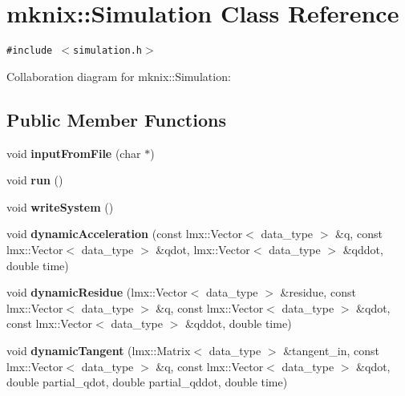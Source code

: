 \hypertarget{classmknix_1_1Simulation}{
\section{mknix::Simulation Class Reference}
\label{classmknix_1_1Simulation}
}
{\tt \#include $<$simulation.h$>$}

Collaboration diagram for mknix::Simulation:\subsection*{Public Member Functions}
\begin{CompactItemize}
\item 
\hypertarget{classmknix_1_1Simulation_5ca9b93b996142dc843eba322b6f81fb}{
void \textbf{inputFromFile} (char $\ast$)}
\label{classmknix_1_1Simulation_5ca9b93b996142dc843eba322b6f81fb}

\item 
\hypertarget{classmknix_1_1Simulation_616f0712431201275269aa05eadb8779}{
void \textbf{run} ()}
\label{classmknix_1_1Simulation_616f0712431201275269aa05eadb8779}

\item 
\hypertarget{classmknix_1_1Simulation_cef86e75795b95441e06f1055402a43b}{
void \textbf{writeSystem} ()}
\label{classmknix_1_1Simulation_cef86e75795b95441e06f1055402a43b}

\item 
\hypertarget{classmknix_1_1Simulation_ce4ce2a959690e14c443b3c6e83c2690}{
void \textbf{dynamicAcceleration} (const lmx::Vector$<$ data\_\-type $>$ \&q, const lmx::Vector$<$ data\_\-type $>$ \&qdot, lmx::Vector$<$ data\_\-type $>$ \&qddot, double time)}
\label{classmknix_1_1Simulation_ce4ce2a959690e14c443b3c6e83c2690}

\item 
\hypertarget{classmknix_1_1Simulation_e78bef0d5f80665be4a0c2d926e99973}{
void \textbf{dynamicResidue} (lmx::Vector$<$ data\_\-type $>$ \&residue, const lmx::Vector$<$ data\_\-type $>$ \&q, const lmx::Vector$<$ data\_\-type $>$ \&qdot, const lmx::Vector$<$ data\_\-type $>$ \&qddot, double time)}
\label{classmknix_1_1Simulation_e78bef0d5f80665be4a0c2d926e99973}

\item 
\hypertarget{classmknix_1_1Simulation_226a281591cb1b0bac253a3dcce19e5b}{
void \textbf{dynamicTangent} (lmx::Matrix$<$ data\_\-type $>$ \&tangent\_\-in, const lmx::Vector$<$ data\_\-type $>$ \&q, const lmx::Vector$<$ data\_\-type $>$ \&qdot, double partial\_\-qdot, double partial\_\-qddot, double time)}
\label{classmknix_1_1Simulation_226a281591cb1b0bac253a3dcce19e5b}


\end{CompactItemize}
